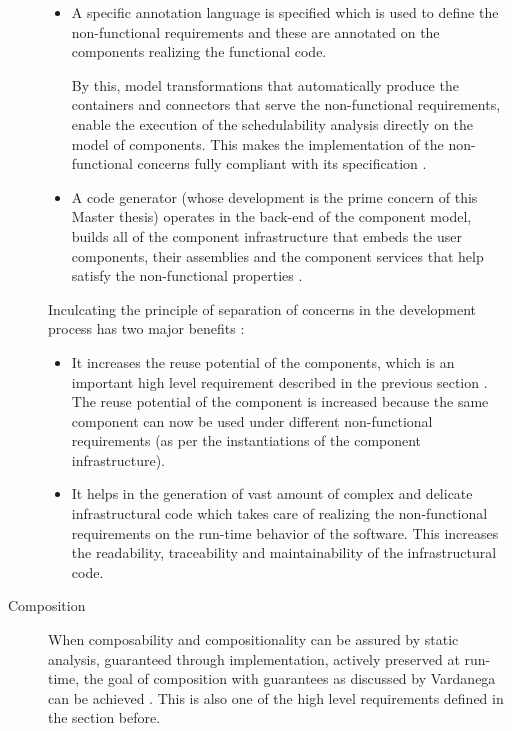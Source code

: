 \begin{description}
\begin{itemize}
\item A specific annotation language is specified which is used to define the non-functional requirements and these are annotated on the components realizing the functional code.

By this, model transformations that automatically produce the containers and connectors that serve the non-functional requirements, enable the execution of the schedulability analysis directly on the model of components. This makes the implementation of the non-functional concerns fully compliant with its specification \cite{ScheduAnaly}. 

\item A code generator (whose development is the prime concern of this Master thesis) operates in the back-end of the component model, builds all of the component infrastructure that embeds the user components, their assemblies and the component services that help satisfy the non-functional properties \cite{CharEvoRAVCodeAr}. 
\end{itemize}

Inculcating the principle of separation of concerns in the development process has two major benefits \cite{CompBasedProcess}:

\begin{itemize}
\item It increases the reuse potential of the components, which is an important high level requirement described in the previous section \cite{SAVOIR}. The reuse potential of the component is increased because the same component can now be used under different non-functional requirements (as per the instantiations of the component infrastructure).

\item It helps in the generation of vast amount of complex and delicate infrastructural code which takes care of realizing the non-functional requirements on the run-time behavior of the software. This increases the readability, traceability and maintainability of the infrastructural code. 
\end{itemize}

\item [Composition] 
\label{section: Founding principle-Composition}
When composability and compositionality can be assured by static analysis, guaranteed through implementation, actively preserved at run-time, the goal of composition with guarantees as discussed by Vardanega can be achieved \cite{CompBasedProcess}. This is also one of the high level requirements defined in the section before.
 

\end{description}
